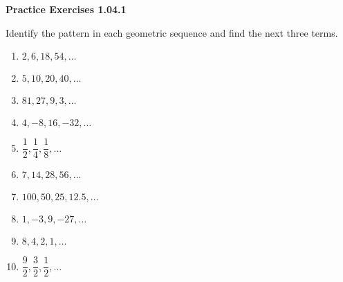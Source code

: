 \vspace{0.3ex}
\noindent\textbf{Practice Exercises 1.04.1}

\vspace{0.2ex}

Identify the pattern in each geometric sequence and find the next three terms.
\begin{multicols}{2}
\begin{enumerate}
    \item $2, 6, 18, 54, \dots$
    \item $5, 10, 20, 40, \dots$
    \item $81, 27, 9, 3, \dots$
    \item $4, -8, 16, -32, \dots$
    \item $\dfrac{1}{2}, \dfrac{1}{4}, \dfrac{1}{8}, \dots$
    \item $7, 14, 28, 56, \dots$
    \item $100, 50, 25, 12.5, \dots$
    \item $1, -3, 9, -27, \dots$
    \item $8, 4, 2, 1, \dots$
    \item $\dfrac{9}{2}, \dfrac{3}{2}, \dfrac{1}{2}, \dots$
    \end{enumerate}
    \end{multicols}
